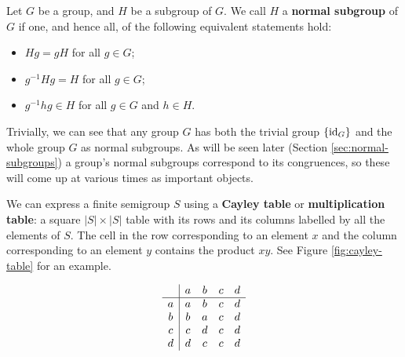 \begin{definition}
  \label{def:normal-subgroup}
  Let $G$ be a group, and $H$ be a subgroup of $G$.  We call $H$ a
  \textbf{normal subgroup} of $G$ if one, and hence all, of the following
  equivalent statements hold:
  \begin{itemize}
  \item $Hg = gH$ for all $g \in G$;
  \item $g^{-1}Hg = H$ for all $g \in G$;
  \item $g^{-1}hg \in H$ for all $g \in G$ and $h \in H$.
  \end{itemize}
\end{definition}

Trivially, we can see that any group $G$ has both the trivial group $\{\operatorname{id}_G\}$
and the whole group $G$ as normal subgroups.  As will be seen later (Section
\ref{sec:normal-subgroups}) a group's normal subgroups correspond to its
congruences, so these will come up at various times as important objects.

\begin{definition}
  \label{def:cayley-table}
  We can express a finite semigroup $S$ using a \textbf{Cayley table} or
  \textbf{multiplication table}: a square $|S| \times |S|$ table with its rows
  and its columns labelled by all the elements of $S$.  The cell in the row
  corresponding to an element $x$ and the column corresponding to an element $y$
  contains the product $xy$.  See Figure \ref{fig:cayley-table} for an example.

  \begin{table}[ht]
    \centering
    \renewcommand\arraystretch{1.2}
    $$
    \begin{array}{c | c c c c}
      & a & b & c & d \\
      \hline
      a & a & b & c & d \\
      b & b & a & c & d \\
      c & c & d & c & d \\
      d & d & c & c & d \\
    \end{array}
    $$
    \renewcommand\arraystretch{0.7}
    \caption{Cayley table of a semigroup with four elements}
    \label{fig:cayley-table}
  \end{table}
\end{definition}

